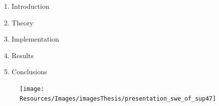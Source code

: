 \begin{frame}
   
   
\begin{minipage}{0.35\textwidth}
{\large
    \begin{enumerate}
     \itemsep3ex
    \item<2-> Introduction
    \item<3-> Theory 
    \item<4-> Implementation
    \item<5-> Results
    \item<6-> Conclusions
    \end{enumerate}
}
\end{minipage}
\begin{minipage}{0.4\textwidth}
     \begin{figure}
     \texttt{[image: Resources/Images/imagesThesis/presentation\_swe\_of\_sup47]}
     \end{figure}
\end{minipage}   
\end{frame}
\clearpage



